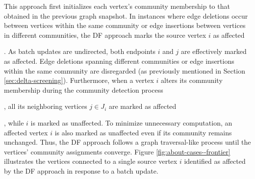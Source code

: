 This approach first initializes each vertex's community membership to that obtained in the previous graph snapshot. In instances where edge deletions occur between vertices within the same community or edge insertions between vertices in different communities, the DF approach marks the source vertex $i$ as affected. As batch updates are undirected, both endpoints $i$ and $j$ are effectively marked as affected. Edge deletions spanning different communities or edge insertions within the same community are disregarded (as previously mentioned in Section \ref{sec:delta-screening}). Furthermore, when a vertex $i$ alters its community membership during the community detection process, all its neighboring vertices $j \in J_i$ are marked as affected, while $i$ is marked as unaffected. To minimize unnecessary computation, an affected vertex $i$ is also marked as unaffected even if its community remains unchanged. Thus, the DF approach follows a graph traversal-like process until the vertices' community assignments converge. Figure \ref{fig:about-cases--frontier} illustrates the vertices connected to a single source vertex $i$ identified as affected by the DF approach in response to a batch update.


